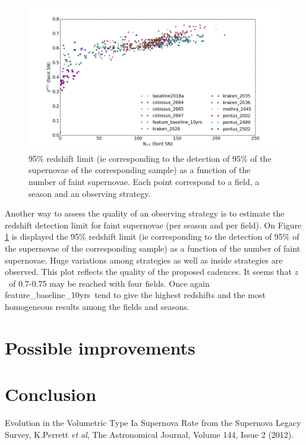 \documentclass [11pt,a4paper]{article}
\newcommand{\feature}{feature\_baseline\_10yrs}
\newcommand{\redshift}{$z$}
\begin{document}
\begin{figure}[htbp]
\begin{center}
  
  \includegraphics[width=15cm]{Figures/Z95_NSN.png}
 \caption{95\% redshift limit (ie corresponding to the detection of 95\% of the supernovae of the corresponding sample) as a function of the number of faint supernovae. Each point correspond to a field, a season and an observing strategy.}\label{fig:z95}
\end{center}
\end{figure}

Another way to assess the quality of an observing strategy is to estimate the redshift detection limit for faint supernovae (per season and per field). On Figure \ref{fig:z95} is displayed the 95\% redshift limit (ie corresponding to the detection of 95\% of the supernovae of the corresponding sample) as a function of the number of faint supernovae. Huge variations among strategies as well as inside strategies are observed. This plot reflects the quality of the proposed cadences. It seems that \redshift~of 0.7-0.75 may be reached with four fields. Once again \feature~tend to give the highest redshifts and the most homogeneous results among the fields and seasons. 

\section{ Possible improvements}

\section{ Conclusion}

\begin{thebibliography}{9}
 Evolution in the Volumetric Type Ia Supernova Rate from the Supernova Legacy Survey, K.Perrett {\it et al}, The Astronomical Journal, Volume 144, Issue 2 (2012).
  
 \end{thebibliography}

\clearpage
\appendix
  

\end{document}
